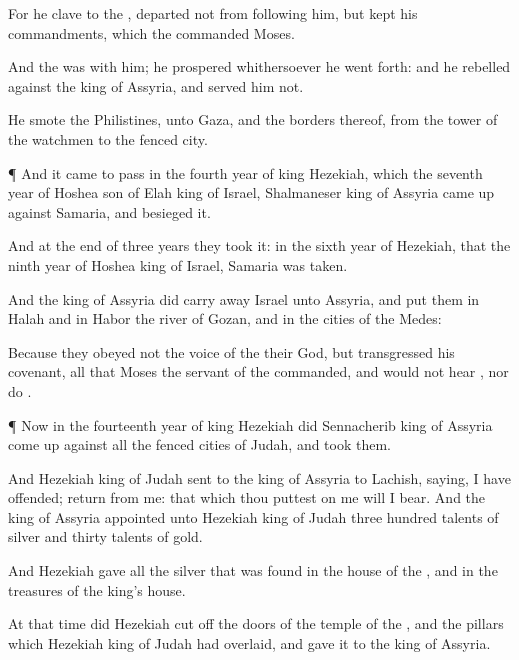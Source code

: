 {For he
clave to the
{},
{}
departed not from
following him, but
kept his
commandments, which the
{}
commanded
Moses.

And the
{} was with him;
{} he
prospered whithersoever he went
forth: and he
rebelled against the
king of
Assyria, and
served him not.

He
smote the
Philistines,
{} unto
Gaza, and the
borders thereof, from the
tower of the
watchmen to the
fenced
city.


\par }{\PP {}¶ And it came to pass in the
fourth
year of
king
Hezekiah, which
{} the
seventh
year of
Hoshea
son of
Elah
king of
Israel,
{}
Shalmaneser
king of
Assyria came
up against
Samaria, and
besieged it.

And at the
end of
three
years they
took it:
{} in the
sixth
year of
Hezekiah, that
{} the
ninth
year of
Hoshea
king of
Israel,
Samaria was
taken.

And the
king of
Assyria did carry
away
Israel unto
Assyria, and
put them in
Halah and in
Habor
{} the
river of
Gozan, and in the
cities of the
Medes:

Because they
obeyed not the
voice of the
{} their
God, but
transgressed his
covenant,
{} all that
Moses the
servant of the
{}
commanded, and would not
hear
{}, nor
do
{}.


\par }{\PP {}¶ Now in the
fourteenth
year of
king
Hezekiah did
Sennacherib
king of
Assyria come
up against all the
fenced
cities of
Judah, and
took them.

And
Hezekiah
king of
Judah
sent to the
king of
Assyria to
Lachish,
saying, I have
offended;
return from me: that which thou
puttest on me will I
bear. And the
king of
Assyria
appointed unto
Hezekiah
king of
Judah
three
hundred
talents of
silver and
thirty
talents of
gold.

And
Hezekiah
gave
{} all the
silver that was
found in the
house of the
{}, and in the
treasures of the
king’s
house.

At that
time did
Hezekiah cut
off
{} the
doors of the
temple of the
{}, and
{} the
pillars which
Hezekiah
king of
Judah had
overlaid, and
gave it to the
king of
Assyria.


}
